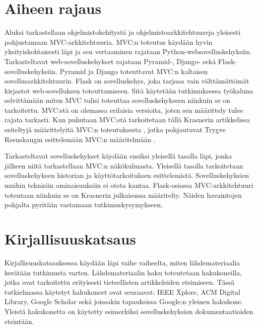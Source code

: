 \documentclass[utf8]{gradu3}
\begin{document}
\chapter{Aiheen rajaus}
Aluksi tarkastellaan ohjelmistokehitystä ja ohjelmistoarkkitehtuureja yleisesti pohjustamaan MVC-arkkitehtuuria. MVC:n toteutus käydään
hyvin yksityiskohtaisesti läpi ja sen vertaaminen rajataan Python-websovelluskehyksiin. Tarkasteltavat web-sovelluskehykset rajataan 
Pyramid-, Django- sekä Flask-sovelluskehyksiin. Pyramid ja Django toteuttavat MVC:n kaltaisen
sovellusarkkitehtuurin. Flask on sovelluskehys, joka tarjoaa vain
välttämättömät kirjastot web-sovelluksen toteuttamiseen. Sitä
käytetään tutkimuksessa työkaluna selvittämään miten MVC tulisi
toteuttaa sovelluskehykseen niinkuin se on tarkoitettu. MVC:stä on olemassa erilaisia versioita, joten sen määrittely tulee rajata tarkasti.
Kun puhutaan MVC:stä tarkoitetaan tällä Krasnerin
artikkelissa esiteltyjä määrittelyitä MVC:n
toteutuksesta \parencite{krasner}, jotka pohjautuvat Trygve Reenskaugin esittelemään 
MVC:n määritelmään \parencite{xerox-original}. 

Tarkasteltavat sovelluskehykset käydään ensiksi yleisellä tasolla läpi, jonka jälkeen niitä tarkastellaan MVC:n näkökulmasta. Yleisellä tasolla tarkoitetaan sovelluskehyksen historian ja käyttötarkoituksen esittelemistä. Sovelluskehyksien muihin teknisiin ominaisuuksiin ei oteta kantaa. Flask-osiossa MVC-arkkitehtuuri toteutaan niinkuin se on Krasnerin julkaisussa määritelty. Näiden havaintojen pohjalta pyritään vastamaan tutkimuskysymykseen.


\chapter{Kirjallisuuskatsaus}

Kirjallisuuskatsauksessa käydään läpi vaihe vaiheelta, miten
lähdemateriaalia kerätään tutkimusta varten. Lähdemateriaalin 
haku toteutetaan hakukoneilla, jotka ovat tarkoitettu erityisesti 
tieteellisten artikkeleiden etsimiseen. Tässä tutkielmassa käytetyt 
hakukoneet ovat seuraavat: IEEE Xplore, ACM Digital Library, 
Google Scholar sekä joissakin tapauksissa Google:n yleinen
hakukone. Yleistä hakukonetta on käytetty esimerkiksi
sovelluskehyksien dokumentaatioiden etsintään.
\end{document}
